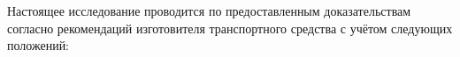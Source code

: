 Настоящее исследование проводится по предоставленным доказательствам   согласно рекомендаций изготовителя транспортного средства с учётом следующих положений:
